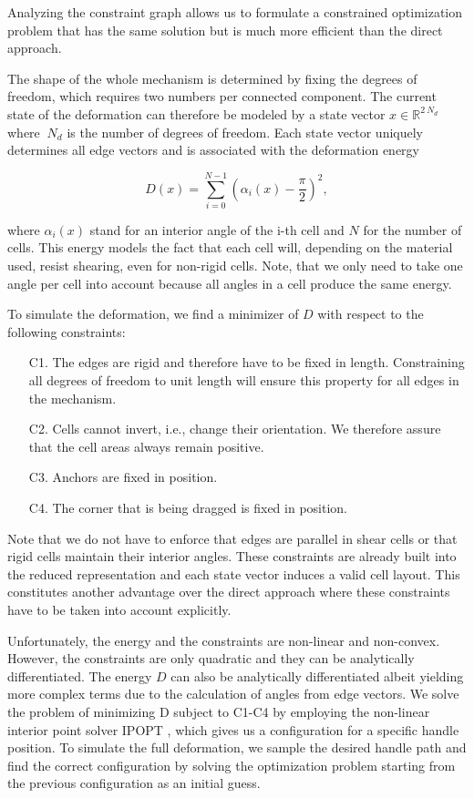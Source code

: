 Analyzing the constraint graph allows us to formulate a constrained optimization problem that has the same solution but is much more efficient than the direct approach.

The shape of the whole mechanism is determined by fixing the degrees of freedom, which requires two numbers per connected component. The current state of the deformation can therefore be modeled by a state vector $x\in\mathbb{R}^{2\ N_d}$ where $\ N_d$ is the number of degrees of freedom. Each state vector uniquely determines all edge vectors and is associated with the deformation energy

$$ D\left(x\right)=\sum_{i=0}^{N-1}\left(\alpha_i\left(x\right)-\frac{\pi}{2}\right)^2,$$

where $\alpha_i(x)$ stand for an interior angle of the i-th cell and $N$ for the number of cells. This energy models the fact that each cell will, depending on the material used, resist shearing, even for non-rigid cells. Note, that we only need to take one angle per cell into account because all angles in a cell produce the same energy. 

To simulate the deformation, we find a minimizer of $D$ with respect to the following constraints:

\begin{itemize}
	\item [C1.] The edges are rigid and therefore have to be fixed in length. Constraining all degrees of freedom to unit length will ensure this property for all edges in the mechanism.
	\item [C2.] Cells cannot invert, i.e., change their orientation. We therefore assure that the cell areas always remain positive.
	\item [C3.] Anchors are fixed in position.
    \item [C4.] The corner that is being dragged is fixed in position.
\end{itemize}
    
Note that we do not have to enforce that edges are parallel in shear cells or that rigid cells maintain their interior angles. These constraints are already built into the reduced representation and each state vector induces a valid cell layout. This constitutes another advantage over the direct approach where these constraints have to be taken into account explicitly.

Unfortunately, the energy and the constraints are non-linear and non-convex. However, the constraints are only quadratic and they can be analytically differentiated. The energy $D$ can also be analytically differentiated albeit yielding more complex terms due to the calculation of angles from edge vectors.
We solve the problem of minimizing D subject to C1-C4 by employing the non-linear interior point solver IPOPT \cite{Waechter2006}, which gives us a configuration for a specific handle position. To simulate the full deformation, we sample the desired handle path and find the correct configuration by solving the optimization problem starting from the previous configuration as an initial guess.


